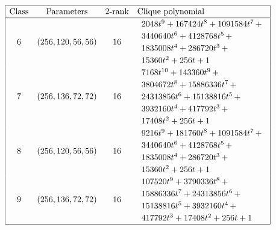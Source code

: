 \documentclass[12pt,a4paper]{article}
\begin{document}
\newpage
\small{}
\begin{align*}
\def\arraystretch{1.2}
\begin{array}{|cccl|}
\hline
\text{Class} &
\text{Parameters} &
\text{2-rank} &
\text{Clique polynomial}
\\
\hline
6 &
(256, 120, 56, 56) &
16 &
\begin{array}{l}
2048t^{9} + 167424t^{8} + 1091584t^{7}
\,+
\\
 3440640t^{6} + 4128768t^{5}
\,+
\\
 1835008t^{4} + 286720t^{3}
\,+
\\
 15360t^{2} + 256t + 1
\end{array}
\\
7 &
(256, 136, 72, 72) &
16 &
\begin{array}{l}
7168t^{10} + 143360t^{9}
\,+
\\
 3804672t^{8} + 15886336t^{7}
\,+
\\
 24313856t^{6} + 15138816t^{5}
\,+
\\
 3932160t^{4} + 417792t^{3}
\,+
\\
 17408t^{2} + 256t + 1
\end{array}
\\
8 &
(256, 120, 56, 56) &
16 &
\begin{array}{l}
9216t^{9} + 181760t^{8} + 1091584t^{7}
\,+
\\
 3440640t^{6} + 4128768t^{5}
\,+
\\
 1835008t^{4} + 286720t^{3}
\,+
\\
 15360t^{2} + 256t + 1
\end{array}
\\
9 &
(256, 136, 72, 72) &
16 &
\begin{array}{l}
107520t^{9} + 3790336t^{8}
\,+
\\
 15886336t^{7} + 24313856t^{6}
\,+
\\
 15138816t^{5} + 3932160t^{4}
\,+
\\
 417792t^{3} + 17408t^{2} + 256t + 1
\end{array}
\\
\hline
\end{array}
\end{align*}
\end{document}
